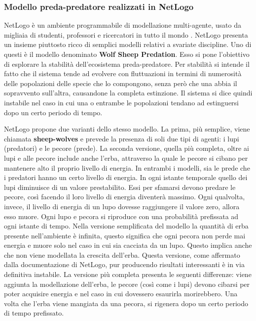 \documentclass[11pt]{article}
\begin{document}
\subsubsection{Modello preda-predatore realizzati in NetLogo}
NetLogo è un ambiente programmabile di modellazione multi-agente, usato da migliaia di studenti, professori e ricercatori in tutto il mondo \cite{Netlogo}. NetLogo presenta un insieme piuttosto ricco di semplici modelli relativi a svariate discipline. Uno di questi è il modello denominato \textbf{Wolf Sheep Predation}. Esso si pone l'obiettivo di esplorare la stabilità dell'ecosistema preda-predatore. Per stabilità si intende il fatto che il sistema tende ad evolvere con fluttuazioni in termini di numerosità delle popolazioni delle specie che lo compongono, senza però che una abbia il sopravvento sull'altra, causandone la completa estinzione. Il sistema si dice quindi instabile nel caso in cui una o entrambe le popolazioni tendano ad estinguersi dopo un certo periodo di tempo.

NetLogo propone due varianti dello stesso modello. La prima, più semplice, viene chiamata \textbf{sheep-wolves} e prevede la presenza di soli due tipi di agenti: i lupi (predatori) e le pecore (prede). La seconda versione, quella più completa, oltre ai lupi e alle pecore include anche l'erba, attraverso la quale le pecore si cibano per mantenere alto il proprio livello di energia. In entrambi i modelli, sia le prede che i predatori hanno un certo livello di energia. In ogni istante temporale quello dei lupi diminuisce di un valore prestabilito. Essi per sfamarsi devono predare le pecore, così facendo il loro livello di energia diventerà massimo. Ogni qualvolta, invece, il livello di energia di un lupo dovesse raggiungere il valore zero, allora esso muore. Ogni lupo e pecora si riproduce con una probabilità prefissata ad ogni istante di tempo. Nella versione semplificata del modello la quantità di erba presente nell'ambiente è infinita, questo significa che ogni pecora non perde mai energia e muore solo nel caso in cui sia cacciata da un lupo. Questo implica anche che non viene modellata la crescita dell'erba. Questa versione, come affermato dalla documentazione di NetLogo, pur producendo risultati interessanti è in via definitiva instabile. La versione più completa presenta le seguenti differenze: viene aggiunta la modellazione dell'erba, le pecore (così come i lupi) devono cibarsi per poter acquisire energia e nel caso in cui dovessero esaurirla morirebbero. Una volta che l'erba viene mangiata da una pecora, si rigenera dopo un certo periodo di tempo prefissato. 
\end{document}
